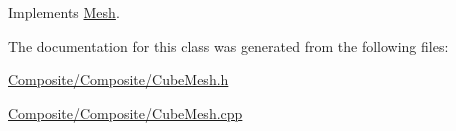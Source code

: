 Implements \mbox{\hyperlink{class_mesh_ad8480168123d9a70563b00cdbe7e73ed}{Mesh}}.



The documentation for this class was generated from the following files\+:\begin{DoxyCompactItemize}
\item 
\mbox{\hyperlink{_composite_2_composite_2_cube_mesh_8h}{Composite/\+Composite/\+Cube\+Mesh.\+h}}\item 
\mbox{\hyperlink{_composite_2_composite_2_cube_mesh_8cpp}{Composite/\+Composite/\+Cube\+Mesh.\+cpp}}\end{DoxyCompactItemize}
